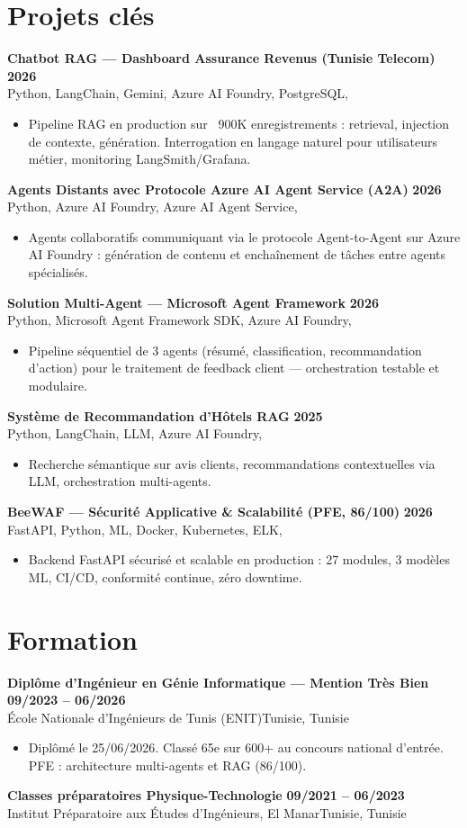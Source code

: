 \documentclass[a4paper,9pt]{article}
\newcommand{\cventry}[4]{\textbf{#1} \hfill \textbf{#4}\\[0.2pt]#2{\ifx\relax#3\relax\else, #3\fi}\par\vspace{0.3pt}}
\begin{document}
\section{Projets clés}
\cventry{Chatbot RAG --- Dashboard Assurance Revenus (Tunisie Telecom)}{Python, LangChain, Gemini, Azure AI Foundry, PostgreSQL}{}{2026}
\begin{itemize}
  \item Pipeline RAG en production sur ~900K enregistrements : retrieval, injection de contexte, génération. Interrogation en langage naturel pour utilisateurs métier, monitoring LangSmith/Grafana.
\end{itemize}
\cventry{Agents Distants avec Protocole Azure AI Agent Service (A2A)}{Python, Azure AI Foundry, Azure AI Agent Service}{}{2026}
\begin{itemize}
  \item Agents collaboratifs communiquant via le protocole Agent-to-Agent sur Azure AI Foundry : génération de contenu et enchaînement de tâches entre agents spécialisés.
\end{itemize}
\cventry{Solution Multi-Agent --- Microsoft Agent Framework}{Python, Microsoft Agent Framework SDK, Azure AI Foundry}{}{2026}
\begin{itemize}
  \item Pipeline séquentiel de 3 agents (résumé, classification, recommandation d'action) pour le traitement de feedback client --- orchestration testable et modulaire.
\end{itemize}
\cventry{Système de Recommandation d'Hôtels RAG}{Python, LangChain, LLM, Azure AI Foundry}{}{2025}
\begin{itemize}
  \item Recherche sémantique sur avis clients, recommandations contextuelles via LLM, orchestration multi-agents.
\end{itemize}
\cventry{BeeWAF --- Sécurité Applicative \& Scalabilité (PFE, 86/100)}{FastAPI, Python, ML, Docker, Kubernetes, ELK}{}{2026}
\begin{itemize}
  \item Backend FastAPI sécurisé et scalable en production : 27 modules, 3 modèles ML, CI/CD, conformité continue, zéro downtime.
\end{itemize}
\section{Formation}
\cventry{Diplôme d'Ingénieur en Génie Informatique --- Mention Très Bien}{École Nationale d'Ingénieurs de Tunis (ENIT)}{Tunisie}{09/2023 -- 06/2026}
\begin{itemize}
  \item Diplômé le 25/06/2026. Classé 65e sur 600+ au concours national d'entrée. PFE : architecture multi-agents et RAG (86/100).
\end{itemize}
\cventry{Classes préparatoires Physique-Technologie}{Institut Préparatoire aux Études d'Ingénieurs, El Manar}{Tunisie}{09/2021 -- 06/2023}
\end{document}
